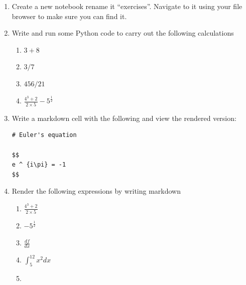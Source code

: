 \begin{enumerate}

\item 

Create a new notebook rename it ``exercises''. Navigate to it using your file browser to make sure you can find it.

\item 

Write and run some Python code to carry out the following calculations
\begin{enumerate}

\item 

\(3 + 8\)

\item 

\(3 / 7\)

\item 

\(456 / 21\)

\item 

\(\frac{4 ^ 3 + 2}{2\times 5} - 5 ^ {\frac{1}{2}}\)

\end{enumerate}

\item 

Write a markdown cell with the following and view the rendered version:

\begin{verbatim}
# Euler's equation

$$
e ^ {i\pi} = -1
$$
\end{verbatim}

\item 

Render the following expressions by writing markdown
\begin{enumerate}

\item 

\(\frac{4 ^ 3 + 2}{2\times 5}\)

\item 

\(- 5 ^ {\frac{1}{2}}\)

\item 

\(\frac{df}{dx}\)

\item 

\(\int_{5}^{12}x^2dx\)

\item 


\end{enumerate}
\end{enumerate}
